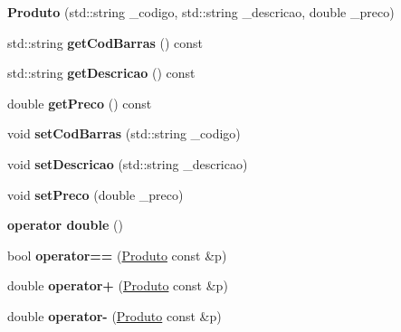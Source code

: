 \begin{DoxyCompactItemize}
\item 
\mbox{\label{classProduto_a12dc783d4f1e016d1eefea0b3f83a6b0}} 
{\bfseries Produto} (std\+::string \+\_\+codigo, std\+::string \+\_\+descricao, double \+\_\+preco)
\item 
\mbox{\label{classProduto_afe2d2b5330ac2a4be858141aa7ec1e96}} 
std\+::string {\bfseries get\+Cod\+Barras} () const
\item 
\mbox{\label{classProduto_acf6b619f58c3e69a3ecaa0946cc83699}} 
std\+::string {\bfseries get\+Descricao} () const
\item 
\mbox{\label{classProduto_ace1d384192a7f2cfc7768afa6b7fcbf5}} 
double {\bfseries get\+Preco} () const
\item 
\mbox{\label{classProduto_a8f8e7d58e53d3f175bc41b2481dbf477}} 
void {\bfseries set\+Cod\+Barras} (std\+::string \+\_\+codigo)
\item 
\mbox{\label{classProduto_a35b8ac377821ca2197becf75e1063509}} 
void {\bfseries set\+Descricao} (std\+::string \+\_\+descricao)
\item 
\mbox{\label{classProduto_a207ec4b3438d376227ca3053a14669cf}} 
void {\bfseries set\+Preco} (double \+\_\+preco)
\item 
\mbox{\label{classProduto_ae5330ecb2af5add388ff14500f2fe67a}} 
{\bfseries operator double} ()
\item 
\mbox{\label{classProduto_a2495b539fbd1efa333867c29dce4af7a}} 
bool {\bfseries operator==} (\hyperlink{classProduto}{Produto} const \&p)
\item 
\mbox{\label{classProduto_a4100739cbf6a9d7a23c4c4299a1192be}} 
double {\bfseries operator+} (\hyperlink{classProduto}{Produto} const \&p)
\item 
\mbox{\label{classProduto_a442790572afe412a6e5ef32c0b81c1ce}} 
double {\bfseries operator-\/} (\hyperlink{classProduto}{Produto} const \&p)
\end{DoxyCompactItemize}

